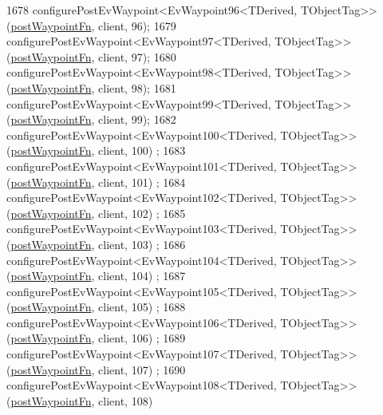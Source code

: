 \begin{DoxyCode}
1678     configurePostEvWaypoint<EvWaypoint96<TDerived, TObjectTag>>(\hyperlink{classmove__base__z__client_1_1WaypointEventDispatcher_acc538eb7506c13f7cca2268a1742dadd}{postWaypointFn}, client, 96);
1679     configurePostEvWaypoint<EvWaypoint97<TDerived, TObjectTag>>(\hyperlink{classmove__base__z__client_1_1WaypointEventDispatcher_acc538eb7506c13f7cca2268a1742dadd}{postWaypointFn}, client, 97);
1680     configurePostEvWaypoint<EvWaypoint98<TDerived, TObjectTag>>(\hyperlink{classmove__base__z__client_1_1WaypointEventDispatcher_acc538eb7506c13f7cca2268a1742dadd}{postWaypointFn}, client, 98);
1681     configurePostEvWaypoint<EvWaypoint99<TDerived, TObjectTag>>(\hyperlink{classmove__base__z__client_1_1WaypointEventDispatcher_acc538eb7506c13f7cca2268a1742dadd}{postWaypointFn}, client, 99);
1682     configurePostEvWaypoint<EvWaypoint100<TDerived, TObjectTag>>(\hyperlink{classmove__base__z__client_1_1WaypointEventDispatcher_acc538eb7506c13f7cca2268a1742dadd}{postWaypointFn}, client, 100)
      ;
1683     configurePostEvWaypoint<EvWaypoint101<TDerived, TObjectTag>>(\hyperlink{classmove__base__z__client_1_1WaypointEventDispatcher_acc538eb7506c13f7cca2268a1742dadd}{postWaypointFn}, client, 101)
      ;
1684     configurePostEvWaypoint<EvWaypoint102<TDerived, TObjectTag>>(\hyperlink{classmove__base__z__client_1_1WaypointEventDispatcher_acc538eb7506c13f7cca2268a1742dadd}{postWaypointFn}, client, 102)
      ;
1685     configurePostEvWaypoint<EvWaypoint103<TDerived, TObjectTag>>(\hyperlink{classmove__base__z__client_1_1WaypointEventDispatcher_acc538eb7506c13f7cca2268a1742dadd}{postWaypointFn}, client, 103)
      ;
1686     configurePostEvWaypoint<EvWaypoint104<TDerived, TObjectTag>>(\hyperlink{classmove__base__z__client_1_1WaypointEventDispatcher_acc538eb7506c13f7cca2268a1742dadd}{postWaypointFn}, client, 104)
      ;
1687     configurePostEvWaypoint<EvWaypoint105<TDerived, TObjectTag>>(\hyperlink{classmove__base__z__client_1_1WaypointEventDispatcher_acc538eb7506c13f7cca2268a1742dadd}{postWaypointFn}, client, 105)
      ;
1688     configurePostEvWaypoint<EvWaypoint106<TDerived, TObjectTag>>(\hyperlink{classmove__base__z__client_1_1WaypointEventDispatcher_acc538eb7506c13f7cca2268a1742dadd}{postWaypointFn}, client, 106)
      ;
1689     configurePostEvWaypoint<EvWaypoint107<TDerived, TObjectTag>>(\hyperlink{classmove__base__z__client_1_1WaypointEventDispatcher_acc538eb7506c13f7cca2268a1742dadd}{postWaypointFn}, client, 107)
      ;
1690     configurePostEvWaypoint<EvWaypoint108<TDerived, TObjectTag>>(\hyperlink{classmove__base__z__client_1_1WaypointEventDispatcher_acc538eb7506c13f7cca2268a1742dadd}{postWaypointFn}, client, 108)

\end{DoxyCode}
